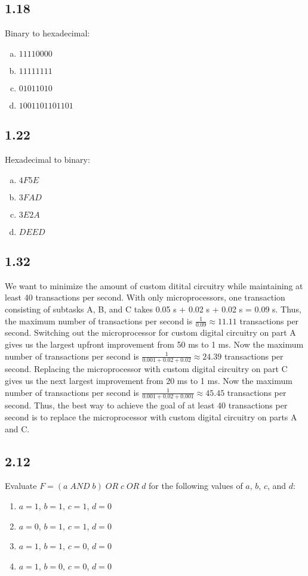 \documentclass{article}
\begin{document}
\subsection*{1.18}
Binary to hexadecimal:
\begin{enumerate}[(a)]
    \item $11110000$
    \item $11111111$
    \item $01011010$
    \item $1001101101101$
\end{enumerate}

\subsection*{1.22}
Hexadecimal to binary:
\begin{enumerate}[(a)]
    \item $4F5E$
    \item $3FAD$
    \item $3E2A$
    \item $DEED$
\end{enumerate}

\subsection*{1.32}
We want to minimize the amount of custom ditital circuitry while maintaining at least 40 transactions per second.
With only microprocessors, one transaction consisting of subtasks A, B, and C takes 0.05 s + 0.02 s + 0.02 s = 0.09 s.
Thus, the maximum number of transactions per second is $\frac{1}{0.09} \approx 11.11$ transactions per second.
Switching out the microprocessor for custom digital circuitry on part A gives us the largest upfront improvement from 50 ms to 1 ms.
Now the maximum number of transactions per second is $\frac{1}{0.001 + 0.02 + 0.02} \approx 24.39$ transactions per second.
Replacing the microprocessor with custom digital circuitry on part C gives us the next largest improvement from 20 ms to 1 ms.
Now the maximum number of transactions per second is $\frac{1}{0.001 + 0.02 + 0.001} \approx 45.45$ transactions per second.
Thus, the best way to achieve the goal of at least 40 transactions per second is to replace the microprocessor with custom digital circuitry on parts A and C.

\subsection*{2.12}
Evaluate $F = (a \; AND \; b) \; OR \; c \; OR \; d$ for the following values of $a$, $b$, $c$, and $d$:
\begin{enumerate}
    \item $a = 1$, $b = 1$, $c = 1$, $d = 0$ \\
    \item $a = 0$, $b = 1$, $c = 1$, $d = 0$ \\
    \item $a = 1$, $b = 1$, $c = 0$, $d = 0$ \\
    \item $a = 1$, $b = 0$, $c = 0$, $d = 0$ \\ 
\end{enumerate}
\end{document}
